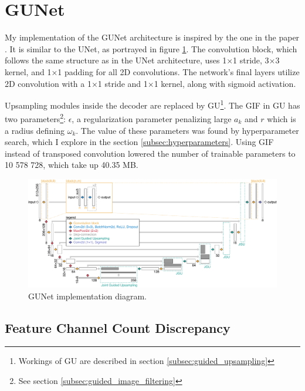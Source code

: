 \section{GUNet}
\label{sec:methodology_gunet}

My implementation of the \gls{GUNet} architecture is inspired by the one in the paper \cite{gunet}. It is similar to the UNet, as portrayed in figure \ref{fig:my_gunet_diagram}. The convolution block, which follows the same structure as in the UNet architecture, uses 1×1 stride, 3×3 kernel, and 1×1 padding for all 2D convolutions. The network's final layers utilize 2D convolution with a 1×1 stride and 1×1 kernel, along with sigmoid activation.

Upsampling modules inside the decoder are replaced by \gls{GU}\footnote{Workings of \gls{GU} are described in section \ref{subsec:guided_upsampling}}. The \gls{GIF} in \gls{GU} has two parameters\footnote{See section \ref{subsec:guided_image_filtering}}: $\epsilon$, a regularization parameter penalizing large $a_k$ and $r$ which is a radius defining $\omega_{k}$. The value of these parameters was found by hyperparameter search, which I explore in the section \ref{subsec:hyperparameters}. Using \gls{GIF} instead of transposed convolution lowered the number of trainable parameters to 10 578 728, which take up 40.35 MB.

\begin{figure}[ht]
    \centering
    \includegraphics[width=\textwidth]{images/my_gunet_diagram.pdf}
    \caption[GUNet implementation diagram]{\label{fig:my_gunet_diagram}GUNet implementation diagram.}
\end{figure}

\subsection{Feature Channel Count Discrepancy}
\label{subsed:channel_discrepancy}

